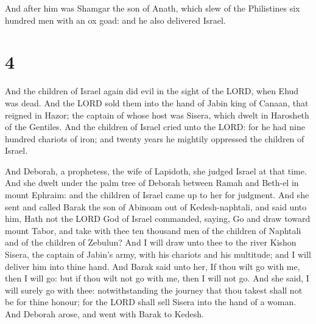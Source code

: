  And after him was Shamgar the son of Anath, which slew of
the Philistines six hundred men with an ox goad: and he also delivered
Israel.

\hypertarget{section-3}{%
\section{4}\label{section-3}}

 And the children of Israel again did evil in the sight of
the LORD, when Ehud was dead.  And the LORD sold them into
the hand of Jabin king of Canaan, that reigned in Hazor; the captain of
whose host was Sisera, which dwelt in Harosheth of the Gentiles.
 And the children of Israel cried unto the LORD: for he had
nine hundred chariots of iron; and twenty years he mightily oppressed
the children of Israel.

 And Deborah, a prophetess, the wife of Lapidoth, she judged
Israel at that time.  And she dwelt under the palm tree of
Deborah between Ramah and Beth-el in mount Ephraim: and the children of
Israel came up to her for judgment.  And she sent and called
Barak the son of Abinoam out of Kedesh-naphtali, and said unto him, Hath
not the LORD God of Israel commanded, saying, Go and draw toward mount
Tabor, and take with thee ten thousand men of the children of Naphtali
and of the children of Zebulun?  And I will draw unto thee
to the river Kishon Sisera, the captain of Jabin's army, with his
chariots and his multitude; and I will deliver him into thine hand.
 And Barak said unto her, If thou wilt go with me, then I
will go: but if thou wilt not go with me, then I will not go.
 And she said, I will surely go with thee: notwithstanding
the journey that thou takest shall not be for thine honour; for the LORD
shall sell Sisera into the hand of a woman. And Deborah arose, and went
with Barak to Kedesh.

